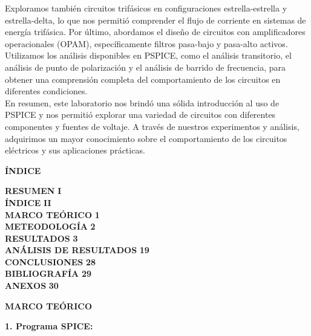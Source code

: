 \documentclass[12pt]{article}
\begin{document}
	Exploramos también circuitos trifásicos en configuraciones estrella-estrella y estrella-delta, lo que nos permitió comprender el flujo de corriente en sistemas de energía trifásica. Por último, abordamos el diseño de circuitos con amplificadores operacionales (OPAM), específicamente filtros pasa-bajo y pasa-alto activos. Utilizamos los análisis disponibles en PSPICE, como el análisis transitorio, el análisis de punto de polarización y el análisis de barrido de frecuencia, para obtener una comprensión completa del comportamiento de los circuitos en diferentes condiciones.\\
	
	En resumen, este laboratorio nos brindó una sólida introducción al uso de PSPICE y nos permitió explorar una variedad de circuitos con diferentes componentes y fuentes de voltaje. A través de nuestros experimentos y análisis, adquirimos un mayor conocimiento sobre el comportamiento de los circuitos eléctricos y sus aplicaciones prácticas.\\
	
	\newpage
	
	\begin{center}
		\textbf{\large ÍNDICE}\\
	\end{center}
	
	\noindent \textbf{RESUMEN} \hfill \textbf{I}\\
	\noindent \textbf{ÍNDICE} \hfill \textbf{II}\\
	\noindent \textbf{MARCO TEÓRICO} \hfill \textbf{1}\\
	\noindent \textbf{METEODOLOGÍA} \hfill \textbf{2}\\
	\noindent \textbf{RESULTADOS} \hfill \textbf{3}\\
	\noindent \textbf{ANÁLISIS DE RESULTADOS} \hfill \textbf{19}\\
	\noindent \textbf{CONCLUSIONES} \hfill \textbf{28}\\
	\noindent \textbf{BIBLIOGRAFÍA} \hfill \textbf{29}\\
	\noindent \textbf{ANEXOS} \hfill \textbf{30}\\
	
	\newpage
	
	
	\begin{center}
		\textbf{\large MARCO TEÓRICO}\\
	\end{center}
	
	\textbf{1. Programa SPICE:}\\
	
\end{document}
